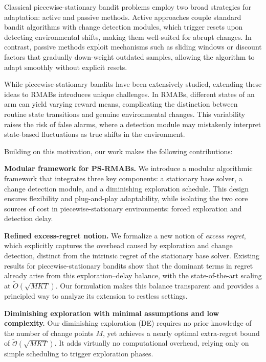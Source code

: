 \documentclass[twoside]{article}
\theoremstyle{plain}
\theoremstyle{definition}
\theoremstyle{remark}
\begin{document}
Classical piecewise-stationary bandit problems employ two broad strategies for adaptation: active and passive methods. Active approaches couple standard bandit algorithms with change detection modules, which trigger resets upon detecting environmental shifts, making them well-suited for abrupt changes. In contrast, passive methods exploit mechanisms such as sliding windows or discount factors that gradually down-weight outdated samples, allowing the algorithm to adapt smoothly without explicit resets.

While piecewise-stationary bandits have been extensively studied, extending these ideas to RMABs introduces unique challenges. In RMABs, different states of an arm can yield varying reward means, complicating the distinction between routine state transitions and genuine environmental changes. This variability raises the risk of false alarms, where a detection module may mistakenly interpret state-based fluctuations as true shifts in the environment.

Building on this motivation, our work makes the following contributions:

\textbf{Modular framework for PS-RMABs.} 
We introduce a modular algorithmic framework that integrates three key components: 
a stationary base solver, a change detection module, and a diminishing exploration schedule. 
This design ensures flexibility and plug-and-play adaptability, while isolating the two 
core sources of cost in piecewise-stationary environments: forced exploration and detection delay. 


\textbf{Refined excess-regret notion.} 
We formalize a new notion of \emph{excess regret}, which explicitly captures the 
overhead caused by exploration and change detection, distinct from the intrinsic 
regret of the stationary base solver. Existing results for piecewise-stationary bandits 
show that the dominant terms in regret already arise from this exploration–delay balance, 
with the state-of-the-art scaling at $\tilde{O}(\sqrt{MKT})$. 
Our formulation makes this balance transparent and provides a principled way to analyze 
its extension to restless settings.

\textbf{Diminishing exploration with minimal assumptions and low complexity.} 
Our diminishing exploration (DE) requires no prior knowledge of the number of change points \(M\),
yet achieves a nearly optimal extra-regret bound of \(\tilde{\mathcal{O}}(\sqrt{MKT})\).
It adds virtually no computational overhead, relying only on simple scheduling to trigger exploration phases.
\end{document}
